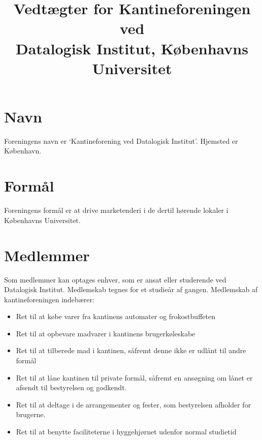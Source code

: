 \documentclass[a4paper, 10pt]{article}
\title{Vedtægter for Kantineforeningen ved \\ Datalogisk Institut,
Københavns Universitet}
\author{}
\date{}
\begin{document}
\maketitle

\section{Navn}

\label{navn} Foreningens navn er `Kantineforening ved Datalogisk
Institut'. Hjemsted er København.

\section{Formål}

\label{formaal} Foreningens formål er at drive marketenderi i de
dertil hørende lokaler i Kø\-benhavns Universitet.

\section{Medlemmer}

\label{medlemmer} Som medlemmer kan optages enhver, som er ansat eller
studerende ved Datalogisk Institut. Medlemskab tegnes for et studieår
af gangen. Medlemskab af kantineforeningen indebærer:

\medskip

\begin{itemize}

\item Ret til at købe varer fra kantinens automater og frokostbuffeten

\item Ret til at opbevare madvarer i kantinens brugerkøleskabe

\item Ret til at tilberede mad i kantinen, såfremt denne ikke er
udlånt til andre formål

\item Ret til at låne kantinen til private formål, såfremt en
ansøgning om lånet er afsendt til bestyrelsen og godkendt.

\item Ret til at deltage i de arrangementer og fester, som bestyrelsen
afholder for brugerne.

\item Ret til at benytte faciliteterne i hyggehjørnet udenfor normal
studietid

\end{itemize}
\end{document}
